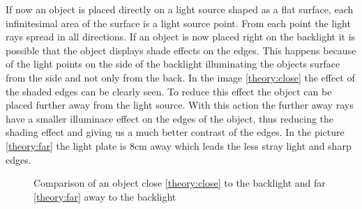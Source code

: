 If now an object is placed directly on a light source shaped as a flat surface, each infinitesimal area of the surface is a light source point. From each point the light rays spread in all directions. If an object is now placed right on the backlight it is possible that the object displays shade effects on the edges. This happens because of the light points on the side of the backlight illuminating the objects surface from the side and not only from the back. In the image \ref{theory:close} the effect of the shaded edges can be clearly seen. To reduce this effect the object can be placed further away from the light source. With this action the further away rays have a smaller illuminace effect on the edges of the object, thus reducing the shading effect and giving us a much better contrast of the edges. In the picture \ref{theory:far} the light plate is 8cm away which leads the less stray light and sharp edges.

\begin{figure}[ht]
	\caption{Comparison of an object close \ref{theory:close} to the backlight and far \ref{theory:far} away to the backlight\label{theory:thre}}	
\end{figure}




